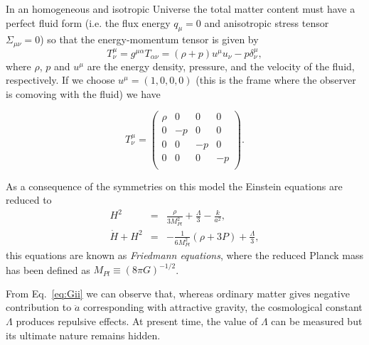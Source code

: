 \documentclass[12pt,letterpaper,twoside]{book}
\begin{document}
In an homogeneous and isotropic Universe the total matter content must have a
perfect fluid form (i.e. the flux energy $q_\mu =0$ and anisotropic stress
tensor $\Sigma_{\mu\nu}=0$) so that the energy-momentum tensor is given by
\begin{equation}
    T^{\mu}_{\nu}=g^{\mu\alpha}T_{\alpha\nu}=\left(\rho+p\right)u^\mu u_\nu - p
    \delta^\mu_\nu,
\end{equation}
where $\rho$, $p$ and $u^\mu$ are the energy density, pressure, and the velocity
of the fluid, respectively. If we choose $u^\mu = (1,0,0,0)$ (this is the frame
where the observer is comoving with the fluid) we have

\begin{equation}
    T^{\mu}_{\nu}=
    \left(
        \begin{array}{cccc}
            \rho & 0  & 0 & 0 \\
            0  & -p  & 0 & 0  \\
            0  & 0  & -p & 0  \\
            0  & 0  & 0 & -p  \\
        \end{array}
    \right).
\end{equation}

As a consequence of the symmetries on this model the Einstein equations are
reduced to
\begin{eqnarray}
   \label{eq:G00}
   H^2        & = & \frac{\rho}{3M_{Pl}^2} + \frac{\Lambda}{3}-\frac{k}{a^2},\\
   \label{eq:Gii}
   \dot{H}+H^2 & = & -\frac{1}{6M_{Pl}^2}\left(\rho+3P\right)+\frac{\Lambda}{3},
\end{eqnarray}
this equations are known as \textit{Friedmann equations}, where the reduced
Planck mass has been defined as $M_{Pl} \equiv (8\pi G)^{-1/2}$.

From Eq.~\eqref{eq:Gii} we can observe that, whereas ordinary matter gives
negative contribution to $\ddot{a}$ corresponding with attractive gravity, the
cosmological constant $\Lambda$ produces repulsive effects. At present time, the
value of $\Lambda$ can be measured but its ultimate nature remains hidden.
\end{document}
